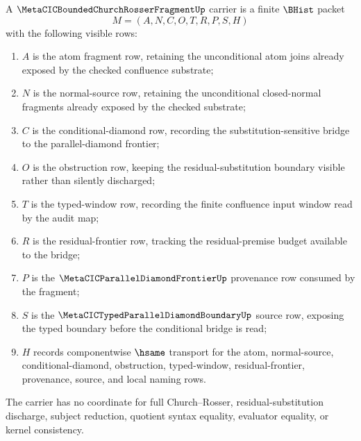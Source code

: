 \begin{definition}
\label{def:metacic-bounded-church-rosser-fragment-carrier}
A $\MetaCICBoundedChurchRosserFragmentUp$ carrier is a finite $\BHist$ packet
$$
M=(A,N,C,O,T,R,P,S,H)
$$
with the following visible rows:
\begin{enumerate}
\item $A$ is the atom fragment row, retaining the unconditional atom joins already exposed by the checked confluence substrate;
\item $N$ is the normal-source row, retaining the unconditional closed-normal fragments already exposed by the checked substrate;
\item $C$ is the conditional-diamond row, recording the substitution-sensitive bridge to the parallel-diamond frontier;
\item $O$ is the obstruction row, keeping the residual-substitution boundary visible rather than silently discharged;
\item $T$ is the typed-window row, recording the finite confluence input window read by the audit map;
\item $R$ is the residual-frontier row, tracking the residual-premise budget available to the bridge;
\item $P$ is the $\MetaCICParallelDiamondFrontierUp$ provenance row consumed by the fragment;
\item $S$ is the $\MetaCICTypedParallelDiamondBoundaryUp$ source row, exposing the typed boundary before the conditional bridge is read;
\item $H$ records componentwise $\hsame$ transport for the atom, normal-source, conditional-diamond, obstruction, typed-window, residual-frontier, provenance, source, and local naming rows.
\end{enumerate}
The carrier has no coordinate for full Church--Rosser, residual-substitution discharge, subject reduction, quotient syntax equality, evaluator equality, or kernel consistency.
\end{definition}


